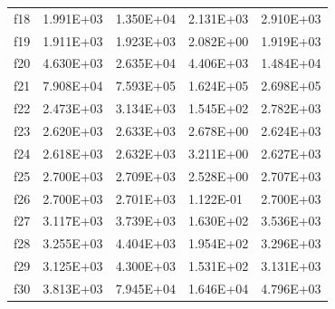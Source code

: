 \begin{table}[]
\begin{tabular}{lllll}
f18 & 1.991E+03 & 1.350E+04 & 2.131E+03 & 2.910E+03 \\
f19 & 1.911E+03 & 1.923E+03 & 2.082E+00 & 1.919E+03 \\
f20 & 4.630E+03 & 2.635E+04 & 4.406E+03 & 1.484E+04 \\
f21 & 7.908E+04 & 7.593E+05 & 1.624E+05 & 2.698E+05 \\
f22 & 2.473E+03 & 3.134E+03 & 1.545E+02 & 2.782E+03 \\
f23 & 2.620E+03 & 2.633E+03 & 2.678E+00 & 2.624E+03 \\
f24 & 2.618E+03 & 2.632E+03 & 3.211E+00 & 2.627E+03 \\
f25 & 2.700E+03 & 2.709E+03 & 2.528E+00 & 2.707E+03 \\
f26 & 2.700E+03 & 2.701E+03 & 1.122E-01 & 2.700E+03 \\
f27 & 3.117E+03 & 3.739E+03 & 1.630E+02 & 3.536E+03 \\
f28 & 3.255E+03 & 4.404E+03 & 1.954E+02 & 3.296E+03 \\
f29 & 3.125E+03 & 4.300E+03 & 1.531E+02 & 3.131E+03 \\
f30 & 3.813E+03 & 7.945E+04 & 1.646E+04 & 4.796E+03
\end{tabular}
\end{table}
